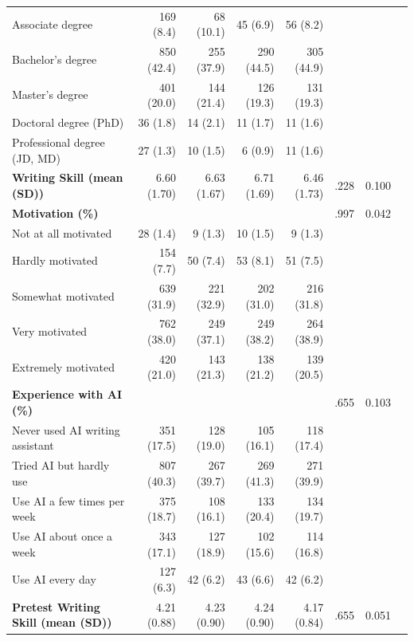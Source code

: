 \documentclass[11pt]{report}
\begin{document}
\begin{append}
\begin{table}[ht]
\begin{tabular}{lrrrrrrr}
\hspace{1em}Associate degree & 169 (8.4) & 68 (10.1) & 45 (6.9) & 56 (8.2) & &  \\ 
\hspace{1em}Bachelor's degree & 850 (42.4) & 255 (37.9) & 290 (44.5) & 305 (44.9) & &  \\ 
\hspace{1em}Master's degree & 401 (20.0) & 144 (21.4) & 126 (19.3) & 131 (19.3) & &  \\ 
\hspace{1em}Doctoral degree (PhD) & 36 (1.8) & 14 (2.1) & 11 (1.7) & 11 (1.6) & &  \\ 
\hspace{1em}Professional degree (JD, MD) & 27 (1.3) & 10 (1.5) & 6 (0.9) & 11 (1.6) & &  \\ 
\textbf{Writing Skill (mean (SD))} & 6.60 (1.70) & 6.63 (1.67) & 6.71 (1.69) & 6.46 (1.73) & .228 & 0.100 \\ 
\textbf{Motivation (\%)} &  &   &   &   & .997 &  0.042 \\ 
\hspace{1em}Not at all motivated & 28 (1.4) & 9 (1.3) & 10 (1.5) & 9 (1.3) &  &  \\ 
\hspace{1em}Hardly motivated & 154 (7.7) & 50 (7.4) & 53 (8.1) & 51 (7.5) &  &  \\ 
\hspace{1em}Somewhat motivated & 639 (31.9) & 221 (32.9) & 202 (31.0) & 216 (31.8) &  &  \\ 
\hspace{1em}Very motivated & 762 (38.0) & 249 (37.1) & 249 (38.2) & 264 (38.9) &  &  \\ 
\hspace{1em}Extremely motivated & 420 (21.0) & 143 (21.3) & 138 (21.2) & 139 (20.5) &  &  \\ 
\textbf{Experience with AI (\%)} &  &   &   &   & .655 & 0.103 \\ 
\hspace{1em}Never used AI writing assistant & 351 (17.5) & 128 (19.0) & 105 (16.1) & 118 (17.4) & &  \\ 
\hspace{1em}Tried AI but hardly use & 807 (40.3) & 267 (39.7) & 269 (41.3) & 271 (39.9) & &  \\ 
\hspace{1em}Use AI a few times per week & 375 (18.7) & 108 (16.1) & 133 (20.4) & 134 (19.7) & &  \\ 
\hspace{1em}Use AI about once a week & 343 (17.1) & 127 (18.9) & 102 (15.6) & 114 (16.8) & &  \\ 
\hspace{1em}Use AI every day & 127 (6.3) & 42 (6.2) & 43 (6.6) & 42 (6.2) & &  \\ 
\textbf{Pretest Writing Skill (mean (SD))} & 4.21 (0.88) & 4.23 (0.90) & 4.24 (0.90) & 4.17 (0.84) & .655 & 0.051 \\ 
\bottomrule
\end{tabular}
\label{tab:s3randomization}
\end{table}



\end{append}
\end{document}
